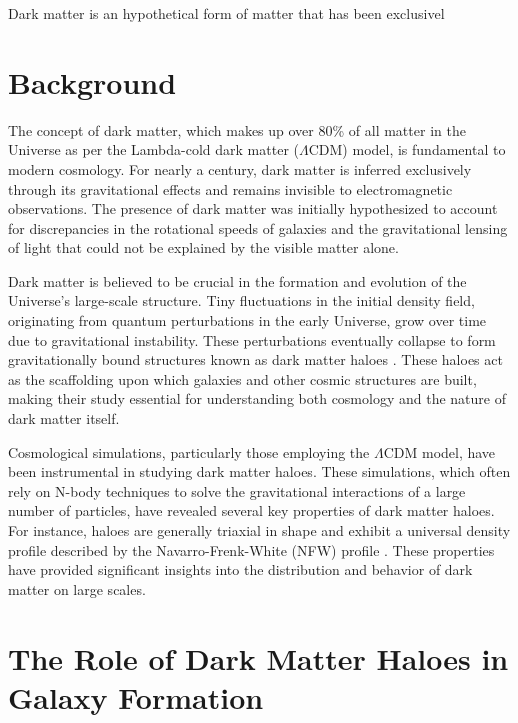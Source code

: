 Dark matter is an hypothetical form of matter that has been exclusivel


\section{Background}

The concept of dark matter, which makes up over 80\% of all matter in the Universe as per the Lambda-cold dark matter ($\Lambda$CDM) model, is fundamental to modern cosmology. For nearly a century, dark matter is inferred exclusively through its gravitational effects and remains invisible to electromagnetic observations. The presence of dark matter was initially hypothesized to account for discrepancies in the rotational speeds of galaxies and the gravitational lensing of light that could not be explained by the visible matter alone.

Dark matter is believed to be crucial in the formation and evolution of the Universe's large-scale structure. Tiny fluctuations in the initial density field, originating from quantum perturbations in the early Universe, grow over time due to gravitational instability. These perturbations eventually collapse to form gravitationally bound structures known as dark matter haloes \citep[][]{1974ApJ...187..425P,2002PhR...372....1C}. These haloes act as the scaffolding upon which galaxies and other cosmic structures are built, making their study essential for understanding both cosmology and the nature of dark matter itself.

Cosmological simulations, particularly those employing the $\Lambda$CDM model, have been instrumental in studying dark matter haloes. These simulations, which often rely on N-body techniques to solve the gravitational interactions of a large number of particles, have revealed several key properties of dark matter haloes. For instance, haloes are generally triaxial in shape \citep[][]{1988ApJ...327..507F} and exhibit a universal density profile described by the Navarro-Frenk-White (NFW) profile \citep{1996ApJ...462..563N,1997ApJ...490..493N,2010MNRAS.402...21N}. These properties have provided significant insights into the distribution and behavior of dark matter on large scales.

\section{The Role of Dark Matter Haloes in Galaxy Formation}

